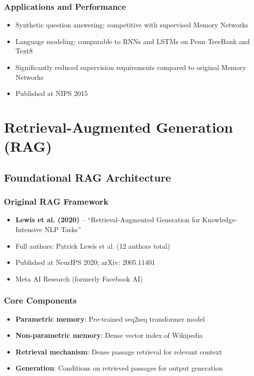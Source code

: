 \documentclass[11pt,letterpaper]{article}
\begin{document}
\subsubsection{Applications and Performance}
\begin{itemize}[leftmargin=*]
    \item Synthetic question answering: competitive with supervised Memory Networks
    \item Language modeling: comparable to RNNs and LSTMs on Penn TreeBank and Text8
    \item Significantly reduced supervision requirements compared to original Memory Networks
    \item Published at NIPS 2015
\end{itemize}

\section{Retrieval-Augmented Generation (RAG)}

\subsection{Foundational RAG Architecture}

\subsubsection{Original RAG Framework}
\begin{itemize}[leftmargin=*]
    \item \textbf{Lewis et al. (2020)} -- ``Retrieval-Augmented Generation for Knowledge-Intensive NLP Tasks'' \cite{lewis2020retrieval}
    \item Full authors: Patrick Lewis et al. (12 authors total)
    \item Published at NeurIPS 2020; arXiv: 2005.11401
    \item Meta AI Research (formerly Facebook AI)
\end{itemize}

\subsubsection{Core Components}
\begin{itemize}[leftmargin=*]
    \item \textbf{Parametric memory}: Pre-trained seq2seq transformer model
    \item \textbf{Non-parametric memory}: Dense vector index of Wikipedia
    \item \textbf{Retrieval mechanism}: Dense passage retrieval for relevant context
    \item \textbf{Generation}: Conditions on retrieved passages for output generation
\end{itemize}
\end{document}
